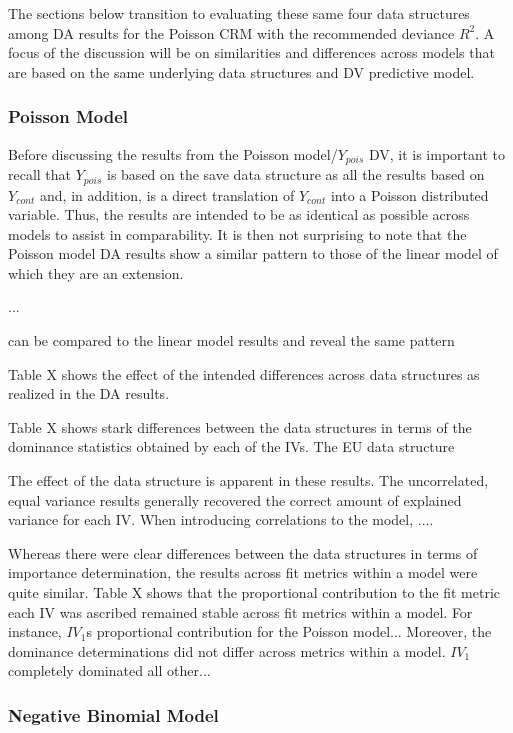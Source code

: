 \documentclass[ShortAfour,times,sageapa]{sagej}
\begin{document}
	The sections below transition to evaluating these same four data structures among DA results for the Poisson CRM with the recommended deviance $R^2$.  
	A focus of the discussion will be on similarities and differences across models that are based on the same underlying data structures and DV predictive model.
	
	\subsubsection{Poisson Model}
	
	Before discussing the results from the Poisson model/$Y_{pois}$ DV, it is important to recall that $Y_{pois}$ is based on the save data structure as all the results based on $Y_{cont}$ and, in addition, is a direct translation of $Y_{cont}$ into a Poisson distributed variable. 
	Thus, the results are intended to be as identical as possible across models to assist in comparability.
	It is then not surprising to note that the Poisson model DA results show a similar pattern to those of the linear model of which they are an extension.
	
	...
	
	can be compared to the linear model results and reveal the same pattern
	
	Table X shows the effect of the intended differences across data structures as realized in the DA results.
	
	Table X shows stark differences between the data structures in terms of the dominance statistics obtained by each of the IVs.  The EU data structure
	
	The effect of the data structure is apparent in these results.  
	The uncorrelated, equal variance results generally recovered the correct amount of explained variance for each IV.  
	When introducing correlations to the model, ....
	
	Whereas there were clear differences between the data structures in terms of importance determination, the results across fit metrics within a model were quite similar.
	Table X shows that the proportional contribution to the fit metric each IV was ascribed remained stable across fit metrics within a model.
	For instance, $IV_1$s proportional contribution for the Poisson model...
	Moreover, the dominance determinations did not differ across metrics within a model.
	$IV_1$ completely dominated all other...
	
	\subsubsection{Negative Binomial Model}
	
\end{document}
